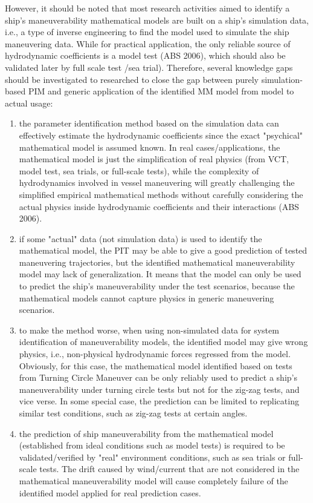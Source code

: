 However, it should be noted that most research activities aimed to identify a ship's maneuverability mathematical models are built on a ship's simulation data, i.e., a type of inverse engineering to find the model used to simulate the ship maneuvering data. While for practical application, the only reliable source of hydrodynamic coefficients is a model test (ABS 2006), which should also be validated later by full scale test /sea trial). Therefore, several knowledge gaps should be investigated to researched to close the gap between purely simulation-based PIM and generic application of the identified MM model from model to actual usage:
\begin{enumerate}
    \item the parameter identification method based on the simulation data can effectively estimate the hydrodynamic coefficients since the exact "psychical" mathematical model is assumed known. In real cases/applications, the mathematical model is just the simplification of real physics (from VCT, model test, sea trials, or full-scale tests), while the complexity of hydrodynamics involved in vessel maneuvering will greatly challenging the simplified empirical mathematical methods without carefully considering the actual physics inside hydrodynamic coefficients and their interactions (ABS 2006).
    \item if some "actual" data (not simulation data) is used to identify the mathematical model, the PIT may be able to give a good prediction of tested maneuvering trajectories, but the identified mathematical maneuverability model may lack of generalization. It means that the model can only be used to predict the ship's maneuverability under the test scenarios, because the mathematical models cannot capture physics in generic maneuvering scenarios.
    \item to make the method worse, when using non-simulated data for system identification of maneuverability models, the identified model may give wrong physics, i.e., non-physical hydrodynamic forces regressed from the model. Obviously, for this case, the mathematical model identified based on tests from Turning Circle Maneuver can be only reliably used to predict a ship's maneuverability under turning circle tests but not for the zig-zag tests, and vice verse. In some special case, the prediction can be limited to replicating similar test conditions, such as zig-zag tests at certain angles.
    \item the prediction of ship maneuverability from the mathematical model (established from ideal conditions such as model tests) is required to be validated/verified by "real" environment conditions, such as sea trials or full-scale tests. The drift caused by wind/current that are not considered in the mathematical maneuverability model will cause completely failure of the identified model applied for real prediction cases.
\end{enumerate}

